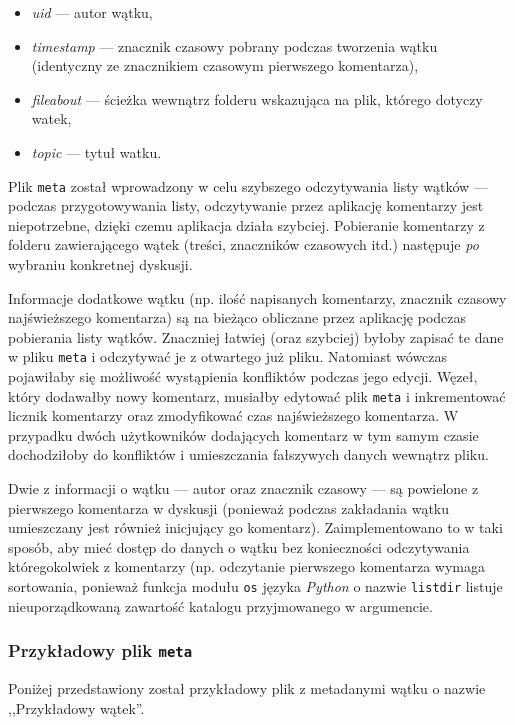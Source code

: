 \begin{itemize}[noitemsep]
  \item \emph{uid} --- autor wątku,
  \item \emph{timestamp} --- znacznik czasowy pobrany podczas tworzenia wątku (identyczny ze znacznikiem czasowym pierwszego komentarza),
  \item \emph{fileabout} --- ścieżka wewnątrz folderu wskazująca na plik, którego dotyczy watek,
  \item \emph{topic} --- tytuł watku.
\end{itemize}

Plik \texttt{meta} został wprowadzony w celu szybszego odczytywania listy wątków --- podczas przygotowywania listy, odczytywanie przez aplikację komentarzy jest niepotrzebne, dzięki czemu aplikacja działa szybciej. Pobieranie komentarzy z folderu zawierającego wątek (treści, znaczników czasowych itd.) następuje \emph{po} wybraniu konkretnej dyskusji.

Informacje dodatkowe wątku (np. ilość napisanych komentarzy, znacznik czasowy najświeższego komentarza) są na bieżąco obliczane przez aplikację podczas pobierania listy wątków. Znaczniej łatwiej (oraz szybciej) byłoby zapisać te dane w pliku \texttt{meta} i odczytywać je z otwartego już pliku. Natomiast wówczas pojawiłaby się możliwość wystąpienia konfliktów podczas jego edycji. Węzeł, który dodawałby nowy komentarz, musiałby edytować plik \texttt{meta} i inkrementować licznik komentarzy oraz zmodyfikować czas najświeższego komentarza. W przypadku dwóch użytkowników dodających komentarz w tym samym czasie dochodziłoby do konfliktów i umieszczania fałszywych danych wewnątrz pliku.

Dwie z informacji o wątku --- autor oraz znacznik czasowy --- są powielone z pierwszego komentarza w dyskusji (ponieważ podczas zakładania wątku umieszczany jest również inicjujący go komentarz). Zaimplementowano to w taki sposób, aby mieć dostęp do danych o wątku bez konieczności odczytywania któregokolwiek z komentarzy (np. odczytanie pierwszego komentarza wymaga sortowania, ponieważ funkcja modułu \texttt{os} języka \emph{Python} o nazwie \texttt{listdir} listuje nieuporządkowaną zawartość katalogu przyjmowanego w argumencie.

\subsubsection*{Przykładowy plik \texttt{meta}}

Poniżej przedstawiony został przykładowy plik z metadanymi wątku o nazwie ,,Przykładowy wątek''.

